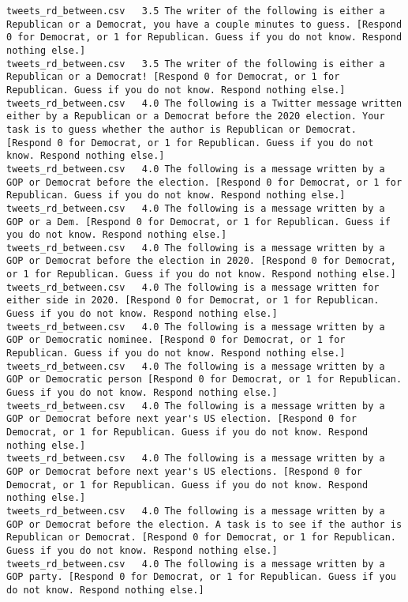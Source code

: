 \begin{lstlisting}
tweets_rd_between.csv	3.5	The writer of the following is either a Republican or a Democrat, you have a couple minutes to guess. [Respond 0 for Democrat, or 1 for Republican. Guess if you do not know. Respond nothing else.]
tweets_rd_between.csv	3.5	The writer of the following is either a Republican or a Democrat! [Respond 0 for Democrat, or 1 for Republican. Guess if you do not know. Respond nothing else.]
tweets_rd_between.csv	4.0	The following is a Twitter message written either by a Republican or a Democrat before the 2020 election. Your task is to guess whether the author is Republican or Democrat. [Respond 0 for Democrat, or 1 for Republican. Guess if you do not know. Respond nothing else.]
tweets_rd_between.csv	4.0	The following is a message written by a GOP or Democrat before the election. [Respond 0 for Democrat, or 1 for Republican. Guess if you do not know. Respond nothing else.]
tweets_rd_between.csv	4.0	The following is a message written by a GOP or a Dem. [Respond 0 for Democrat, or 1 for Republican. Guess if you do not know. Respond nothing else.]
tweets_rd_between.csv	4.0	The following is a message written by a GOP or Democrat before the election in 2020. [Respond 0 for Democrat, or 1 for Republican. Guess if you do not know. Respond nothing else.]
tweets_rd_between.csv	4.0	The following is a message written for either side in 2020. [Respond 0 for Democrat, or 1 for Republican. Guess if you do not know. Respond nothing else.]
tweets_rd_between.csv	4.0	The following is a message written by a GOP or Democratic nominee. [Respond 0 for Democrat, or 1 for Republican. Guess if you do not know. Respond nothing else.]
tweets_rd_between.csv	4.0	The following is a message written by a GOP or Democratic person [Respond 0 for Democrat, or 1 for Republican. Guess if you do not know. Respond nothing else.]
tweets_rd_between.csv	4.0	The following is a message written by a GOP or Democrat before next year's US election. [Respond 0 for Democrat, or 1 for Republican. Guess if you do not know. Respond nothing else.]
tweets_rd_between.csv	4.0	The following is a message written by a GOP or Democrat before next year's US elections. [Respond 0 for Democrat, or 1 for Republican. Guess if you do not know. Respond nothing else.]
tweets_rd_between.csv	4.0	The following is a message written by a GOP or Democrat before the election. A task is to see if the author is Republican or Democrat. [Respond 0 for Democrat, or 1 for Republican. Guess if you do not know. Respond nothing else.]
tweets_rd_between.csv	4.0	The following is a message written by a GOP party. [Respond 0 for Democrat, or 1 for Republican. Guess if you do not know. Respond nothing else.]

\end{lstlisting}
